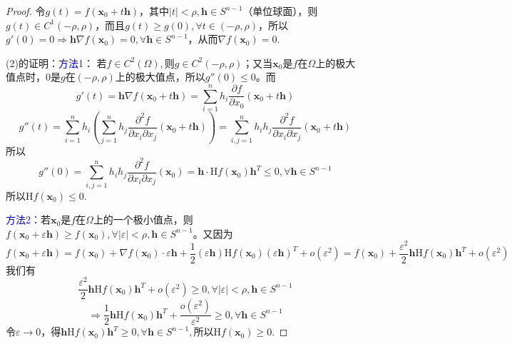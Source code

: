 \documentclass[UTF8]{ctexart}
\newcommand{\p}[2]{\frac{\partial #1}{\partial #2}}
\begin{document}
    \begin{proof}
        令$g(t)=f(\boldsymbol{x}_0+t\boldsymbol{h})$，其中$|t|<\rho,\boldsymbol{h}\in S^{n-1}$（单位球面），则$g(t)\in C^1(-\rho,\rho)$，而且$g(t)\ge g(0),\forall t\in(-\rho,\rho)$，所以$g'(0)=0\Rightarrow \boldsymbol{h}\nabla f(\boldsymbol{x}_0)=0,\forall\boldsymbol{h}\in S^{n-1}$，从而$\nabla f(\boldsymbol{x}_0)=0$.

        (2)的证明：\textcolor{blue}{方法1：}
        若$f\in C^2(\Omega),$则$g\in C^2(-\rho,\rho)$；又当$\boldsymbol{x}_0$是$f$在$\Omega$上的极大值点时，$0$是$g$在$(-\rho,\rho)$上的极大值点，所以$g''(0)\le 0$。而
        $$g'(t)=\boldsymbol{h}\nabla f(\boldsymbol{x}_0+t\boldsymbol{h})=\sum_{i=1}^nh_i\p{f}{x_0}(\boldsymbol{x}_0+t\boldsymbol{h})$$
        $$g''(t)=\sum_{i=1}^nh_i\left(\sum_{j=1}^nh_j\frac{\partial^2f}{\partial x_i\partial x_j}(\boldsymbol{x}_0+t\boldsymbol{h})\right)=\sum_{i,j=1}^nh_ih_j\frac{\partial^2f}{\partial x_i\partial x_j}(\boldsymbol{x}_0+t\boldsymbol{h})$$
        所以$$g''(0)=\sum_{i,j=1}^nh_ih_j\frac{\partial^2f}{\partial x_i\partial x_j}(\boldsymbol{x}_0)=\boldsymbol{h}\cdot \mathrm{H}f(\boldsymbol{x}_0)\boldsymbol{h}^T\le 0,\forall\boldsymbol{h}\in S^{n-1}$$
        所以$\mathrm{H}f(\boldsymbol{x}_0)\le 0$.

        \textcolor{blue}{方法2：}若$\boldsymbol{x}_0$是$f$在$\Omega$上的一个极小值点，则$f(\boldsymbol{x}_0+\varepsilon\boldsymbol{h})\ge f(\boldsymbol{x}_0),\forall|\varepsilon|<\rho,\boldsymbol{h}\in S^{n-1}$。又因为
        $$f(\boldsymbol{x}_0+\varepsilon\boldsymbol{h})=f(\boldsymbol{x}_0)+\nabla f(\boldsymbol{x}_0)\cdot\varepsilon\boldsymbol{h}+\frac{1}{2}(\varepsilon\boldsymbol{h})\mathrm{H}f(\boldsymbol{x}_0)(\varepsilon\boldsymbol{h})^T+o(\varepsilon^2)=f(\boldsymbol{x}_0)+\frac{\varepsilon^2}{2}\boldsymbol{h}\mathrm{H}f(\boldsymbol{x}_0)\boldsymbol{h}^T+o(\varepsilon^2)$$
        我们有
        $$\frac{\varepsilon^2}{2}\boldsymbol{h}\mathrm{H}f(\boldsymbol{x}_0)\boldsymbol{h}^T+o(\varepsilon^2)\ge 0,\forall|\varepsilon|<\rho,
        \boldsymbol{h}\in S^{n-1}$$
        $$\Rightarrow\frac{1}{2}\boldsymbol{h}\mathrm{H}f(\boldsymbol{x}_0)\boldsymbol{h}^T+\frac{o(\varepsilon^2)}{\varepsilon^2}\ge 0,\forall\boldsymbol{h}\in S^{n-1}$$
        令$\varepsilon\to 0$，得$\boldsymbol{h}\mathrm{H}f(\boldsymbol{x}_0)\boldsymbol{h}^T\ge 0,\forall\boldsymbol{h}\in S^{n-1},$所以$\mathrm{H}f(\boldsymbol{x}_0)\ge 0$.
    \end{proof}
\end{document}
